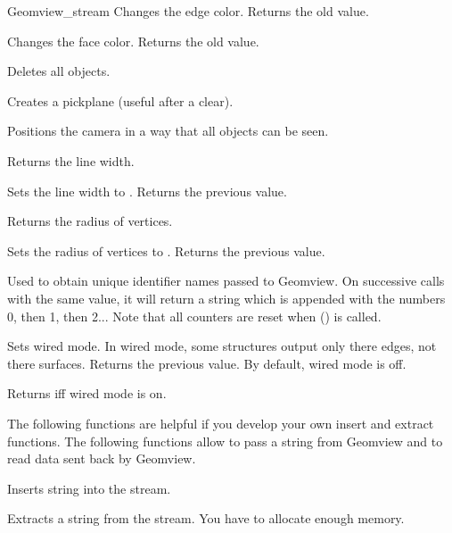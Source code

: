 \begin{ccRefClass}{Geomview_stream}
{Changes the edge color. Returns the old value.}


{Changes the face color. Returns the old value.}



{Deletes all objects.}

{Creates a pickplane (useful after a clear).}

{Positions the camera in a way that all objects can be seen.}

{Returns the line width.}

{Sets the line width to . Returns the previous value.}

{Returns the radius of vertices.}

{Sets the radius of vertices to . Returns the previous value.}

{Used to obtain unique identifier names passed to Geomview.  On successive
calls with the same  value, it will return a string which is 
appended with the numbers 0, then 1, then 2...  Note that all counters are
reset when () is called.}

{Sets wired mode.  In wired mode, some structures output only there edges,
 not there surfaces.
 Returns the previous value. By default, wired mode is off.}

{Returns  iff wired mode is on.}


\begin{ccAdvanced}


The following functions are helpful if you develop your own insert
and extract functions. The following functions allow to pass a string
from Geomview and to read data sent back by Geomview.

{Inserts string  into the stream.}


{Extracts a string  from the stream.
\ccPrecond You have to allocate enough memory.}


\end{ccAdvanced}
\end{ccRefClass}
